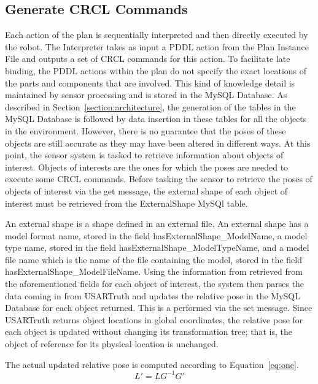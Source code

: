\subsection{Generate CRCL Commands}
\label{subsection:CRCL}
Each action of the plan is sequentially interpreted and then directly executed by the robot. The \textsf{Interpreter} takes as input a PDDL action from the \textsf{Plan Instance File} and outputs a set of CRCL commands for this action. To facilitate late binding, the PDDL actions within the plan  do not specify the exact locations of the parts and components that are involved. This kind of knowledge detail is maintained by sensor processing and is stored in the \textsf{MySQL Database}. As described in Section~\ref{section:architecture}, the generation of the tables in the \textsf{MySQL Database} is followed by data insertion in these tables for all the objects in the environment. However, there is no guarantee that the poses of these objects are still accurate as they may have been altered in different ways. At this point, the sensor system is tasked to retrieve information about objects of interest. Objects of interests are the ones for which the poses are needed to execute some CRCL commands. Before tasking the sensor to retrieve the poses of objects of interest via the \textsf{get} message, the external shape of each object of interest must be retrieved from the \textsf{ExternalShape} MySQl table.

An external shape is a shape defined in an external file. An external shape has a model format name, stored in the field \textsf{hasExternalShape\_ModelName}, a model type name, stored in the field \textsf{hasExternalShape\_ModelTypeName}, and a model file name which is the name of the file containing the model, stored in the field \textsf{hasExternalShape\_ModelFileName}. Using the information from retrieved from the aforementioned fields for each object of interest, the system then parses the data coming in from USARTruth and updates the relative pose in the \textsf{MySQL Database} for each object returned. This is a performed via the \textsf{set} message. Since USARTruth returns object locations in global coordinates, the relative pose for each object is updated without changing its transformation tree; that is, the object of reference for its physical location is unchanged.


The actual updated relative pose is computed according to Equation~\ref{eq:one}.
 \begin{equation}
\label{eq:one}
 L' = LG^{-1}G'
 \end{equation}

